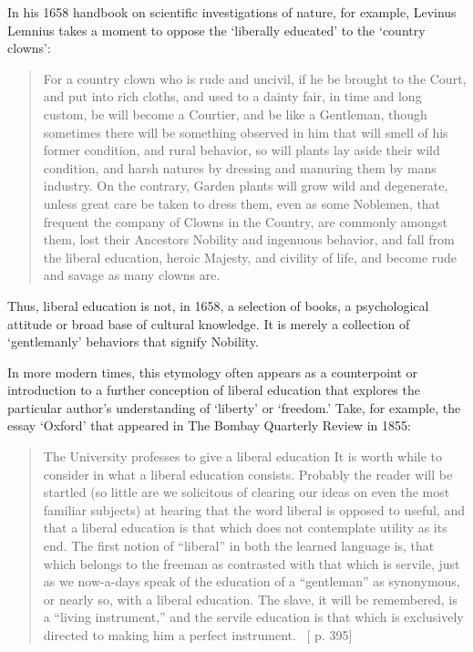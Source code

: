 In his 1658 handbook on scientific investigations of nature, for example, Levinus Lemnius takes a moment to oppose the `liberally educated' to the `country clowns':

\begin{quote}

For a country clown who is rude and uncivil, if he be brought to the Court, and put into rich cloths, and used to a dainty fair, in time and long custom, be will become a Courtier, and be like a Gentleman, though sometimes there will be something observed in him that will smell of his former condition, and rural behavior, so will plants lay aside their wild condition, and harsh natures by dressing and manuring them by mans industry. On the contrary, Garden plants will grow wild and degenerate, unless great care be taken to dress them, even as some Noblemen, that frequent the company of Clowns in the Country, are commonly amongst them, lost their Ancestors Nobility and ingenuous behavior, and fall from the liberal education, heroic Majesty, and civility of life, and become rude and savage as many clowns are. ~\citep[p. 265]{Lemnius:1658un}
\end{quote}

Thus, liberal education is not, in 1658, a selection of books, a psychological attitude or broad base of cultural knowledge. It is merely a collection of `gentlemanly' behaviors that signify Nobility.

In more modern times, this etymology often appears as a counterpoint or introduction to a further conception of liberal education that explores the particular author's understanding of `liberty' or `freedom.' Take, for example, the essay `Oxford' that appeared in The Bombay Quarterly Review in 1855:

\begin{quote}

The University professes to give a liberal education It is worth while to consider in what a liberal education consists. Probably the reader will be startled (so little are we solicitous of clearing our ideas on even the most familiar subjects) at hearing that the word liberal is opposed to useful, and that a liberal education is that which does not contemplate utility as its end. The first notion of ``liberal'' in both the learned language is, that which belongs to the freeman as contrasted with that which is servile, just as we now-a-days speak of the education of a ``gentleman'' as synonymous, or nearly so, with a liberal education. The slave, it will be remembered, is a ``living instrument,'' and the servile education is that which is exclusively directed to making him a perfect instrument. ~\citep{Anonymous:1855ww}[ p. 395]
\end{quote}

